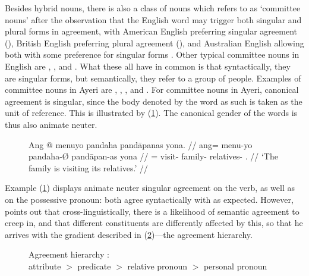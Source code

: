 Besides hybrid nouns, there is also a class of nouns which \citet{corbett2006}
refers to as `committee nouns' after the observation that the English word 
 may trigger both singular and plural forms in agreement, with
American English preferring singular agreement (), British English preferring plural agreement (), and Australian English allowing both with some
preference for singular forms \citep[212--213]{corbett2006}. Other typical
committee nouns in English are , , and .
What these all have in common is that syntactically, they are singular forms,
but semantically, they refer to a group of people. Examples of committee nouns
in Ayeri are , ,
, and .
For committee nouns in Ayeri, canonical agreement is singular, since the body
denoted by the word as such is taken as the unit of reference. This is
illustrated by (\ref{ex:ayrcommitteenoun}). The canonical gender of the words
is thus also animate neuter.

\begin{figure}[h]
\ex\label{ex:ayrcommitteenoun}\begingl
	\gla Ang @ menuyo pandaha pandāpanas yona. //
	\glb ang= menu-yo pandaha-Ø pandāpan-as yona //
	\glc \AgtT{}= visit-\TsgN{} family-\Top{} relatives-\Parg{} 
		\TsgN{}.\Gen{} //
	\glft `The family is visiting its relatives.' //
\endgl\xe
\end{figure}

Example (\ref{ex:ayrcommitteenoun}) displays animate neuter singular agreement
on the verb, as well as on the possessive pronoun: both agree syntactically
with  as expected. However, \citet{corbett2006}
points out that cross-linguistically, there is a likelihood of semantic
agreement to creep in, and that different constituents are differently affected
by this, so that he arrives with the gradient described in
(\ref{ex:agrhier})---the agreement hierarchy.

\begin{figure}[h]
\ex\label{ex:agrhier}%
	Agreement hierarchy \citep[206\psqq]{corbett2006}:\medskip\\
	attribute $>$ predicate $>$ relative pronoun $>$ personal pronoun
\xe
\end{figure}

